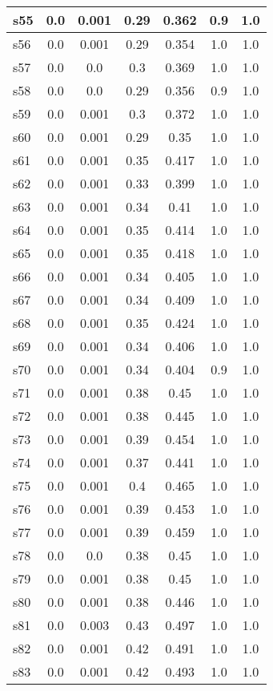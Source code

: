 \documentclass{article}
\begin{document}
\begin{tabular}{|l|c|c|c|c|c|c|}
s55 &0.0 & 0.001 & 0.29 & 0.362 & 0.9 & 1.0\\
\hline
s56 &0.0 & 0.001 & 0.29 & 0.354 & 1.0 & 1.0\\
\hline
s57 &0.0 & 0.0 & 0.3 & 0.369 & 1.0 & 1.0\\
\hline
s58 &0.0 & 0.0 & 0.29 & 0.356 & 0.9 & 1.0\\
\hline
s59 &0.0 & 0.001 & 0.3 & 0.372 & 1.0 & 1.0\\
\hline
s60 &0.0 & 0.001 & 0.29 & 0.35 & 1.0 & 1.0\\
\hline
s61 &0.0 & 0.001 & 0.35 & 0.417 & 1.0 & 1.0\\
\hline
s62 &0.0 & 0.001 & 0.33 & 0.399 & 1.0 & 1.0\\
\hline
s63 &0.0 & 0.001 & 0.34 & 0.41 & 1.0 & 1.0\\
\hline
s64 &0.0 & 0.001 & 0.35 & 0.414 & 1.0 & 1.0\\
\hline
s65 &0.0 & 0.001 & 0.35 & 0.418 & 1.0 & 1.0\\
\hline
s66 &0.0 & 0.001 & 0.34 & 0.405 & 1.0 & 1.0\\
\hline
s67 &0.0 & 0.001 & 0.34 & 0.409 & 1.0 & 1.0\\
\hline
s68 &0.0 & 0.001 & 0.35 & 0.424 & 1.0 & 1.0\\
\hline
s69 &0.0 & 0.001 & 0.34 & 0.406 & 1.0 & 1.0\\
\hline
s70 &0.0 & 0.001 & 0.34 & 0.404 & 0.9 & 1.0\\
\hline
s71 &0.0 & 0.001 & 0.38 & 0.45 & 1.0 & 1.0\\
\hline
s72 &0.0 & 0.001 & 0.38 & 0.445 & 1.0 & 1.0\\
\hline
s73 &0.0 & 0.001 & 0.39 & 0.454 & 1.0 & 1.0\\
\hline
s74 &0.0 & 0.001 & 0.37 & 0.441 & 1.0 & 1.0\\
\hline
s75 &0.0 & 0.001 & 0.4 & 0.465 & 1.0 & 1.0\\
\hline
s76 &0.0 & 0.001 & 0.39 & 0.453 & 1.0 & 1.0\\
\hline
s77 &0.0 & 0.001 & 0.39 & 0.459 & 1.0 & 1.0\\
\hline
s78 &0.0 & 0.0 & 0.38 & 0.45 & 1.0 & 1.0\\
\hline
s79 &0.0 & 0.001 & 0.38 & 0.45 & 1.0 & 1.0\\
\hline
s80 &0.0 & 0.001 & 0.38 & 0.446 & 1.0 & 1.0\\
\hline
s81 &0.0 & 0.003 & 0.43 & 0.497 & 1.0 & 1.0\\
\hline
s82 &0.0 & 0.001 & 0.42 & 0.491 & 1.0 & 1.0\\
\hline
s83 &0.0 & 0.001 & 0.42 & 0.493 & 1.0 & 1.0\\

\end{tabular}
\end{document}
